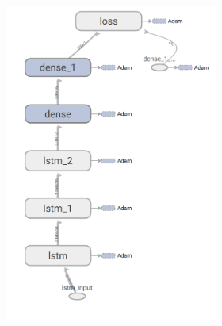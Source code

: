 \begin{figure}
	\centering
	\begin{subfigure}[b]{0.3\linewidth}
		\begin{subfigure}[b]{\linewidth}
			\includegraphics[width=\linewidth]{plots/rnn-candidates-3-lstm-2-dense.png}
		\end{subfigure}
	\end{subfigure}
	\begin{subfigure}[b]{0.3\linewidth}
		\begin{subfigure}[b]{\linewidth}

\end{subfigure}
\end{subfigure}
\end{figure}
